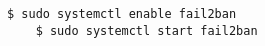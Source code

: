 \begin{lstlisting}[language=term,caption=Starten von fail2ban,label={lst:fail2ban-ssh2}]
    $ sudo systemctl enable fail2ban
    $ sudo systemctl start fail2ban
\end{lstlisting}